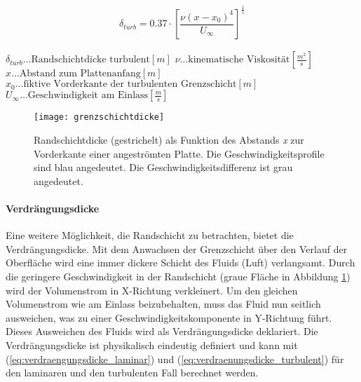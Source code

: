 \begin{align}
\delta_{turb} = 0.37 \cdot \left[\dfrac{\nu\left(x-x_0\right)^4}{U_{\infty}}\right]^\frac{1}{5}
\label{eq:randschichtdicke_turbulent}
\end{align}
\begin{center}
\begin{minipage}{0.5\linewidth}
$\delta_{turb} \dots \text{Randschichtdicke turbulent} \left[m\right]$
$\nu \dots \text{kinematische Viskosität} \left[\frac{m^2}{s}\right]$ \\
$x \dots \text{Abstand zum Plattenanfang} \left[m\right]$ \\
$x_0 \dots \text{fiktive Vorderkante der turbulenten Grenzschicht} \left[m\right]$
$U_{\infty} \dots \text{Geschwindigkeit am Einlass} \left[\frac{m}{s}\right]$\\
\end{minipage}
\end{center}

        \begin{figure}[htb!]
        \begin{center}
        \texttt{[image: grenzschichtdicke]}
        \caption{Randschichtdicke (gestrichelt) als Funktion des Abstands \textit{x} zur Vorderkante einer angeströmten Platte. Die Geschwindigkeitsprofile sind blau angedeutet. Die Geschwindigkeitsdifferenz ist grau angedeutet. \cite[Kap.7, S. 223]{Backus66}}
        \label{fig:grenzschichtdicke_theorie}
        \end{center}
        \end{figure}

\newpage

\paragraph{Verdrängungsdicke}
\label{para:verdraengungsdicke_theorie}
$\;$ \\Eine weitere Möglichkeit, die Randschicht zu betrachten, bietet die Verdrängungsdicke. Mit dem  Anwachsen der Grenzschicht über den Verlauf der Oberfläche wird eine immer dickere Schicht des Fluids (Luft) verlangsamt.  Durch die geringere Geschwindigkeit in der Randschicht (graue Fläche in Abbildung \ref{fig:grenzschichtdicke_theorie}) wird der Volumenstrom in X-Richtung verkleinert. Um den gleichen Volumenstrom wie am Einlass beizubehalten, muss das Fluid nun seitlich ausweichen, was zu einer Geschwindigkeitskomponente in Y-Richtung führt. Dieses Ausweichen des Fluids wird als Verdrängungsdicke deklariert. Die Verdrängungsdicke ist physikalisch eindeutig definiert und kann mit (\ref{eq:verdraengungsdicke_laminar}) und (\ref{eq:verdraenungsdicke_turbulent}) für den laminaren und den turbulenten Fall berechnet werden.



